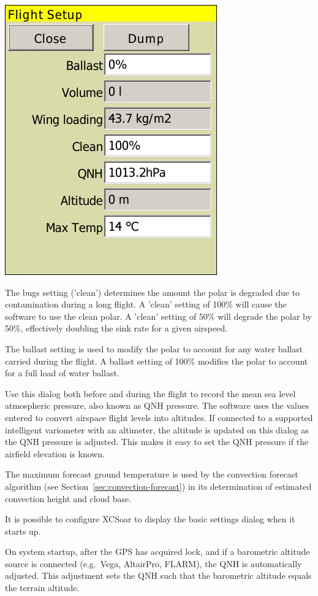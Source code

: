 \documentclass[a4paper,12pt]{refrep}
\begin{document}
\begin{center}
\includegraphics[angle=0,width=0.5\linewidth,keepaspectratio='true']{figures/dialog-basicsettings.png}
\end{center}

The bugs setting ('clean') determines the amount the polar is degraded
due to contamination during a long flight.  A 'clean' setting of 100\%
will cause the software to use the clean polar. A 'clean' setting of
50\% will degrade the polar by 50\%, effectively doubling the sink
rate for a given airspeed.

The ballast setting is used to modify the polar to account for any
water ballast carried during the flight. A ballast setting of 100\%
modifies the polar to account for a full load of water ballast.  

Use this dialog both before and during the flight to record the mean
sea level atmospheric pressure, also known as QNH pressure.  The
software uses the values entered to convert airspace flight levels
into altitudes.  If connected to a supported intelligent variometer
with an altimeter, the altitude is updated on this dialog as the QNH
pressure is adjusted.  This makes it easy to set the QNH pressure if
the airfield elevation is known.

The maximum forecast ground temperature is used by the convection
forecast algorithm (see Section~\ref{sec:convection-forecast}) in its
determination of estimated convection height and cloud base.

\tip It is possible to configure XCSoar to display the basic
settings dialog when it starts up.

On system startup, after the GPS has acquired lock, and if a
barometric altitude source is connected (e.g.\ Vega, AltairPro,
FLARM), the QNH is automatically adjusted.  This adjustment sets the
QNH such that the barometric altitude equals the terrain altitude.
\end{document}

